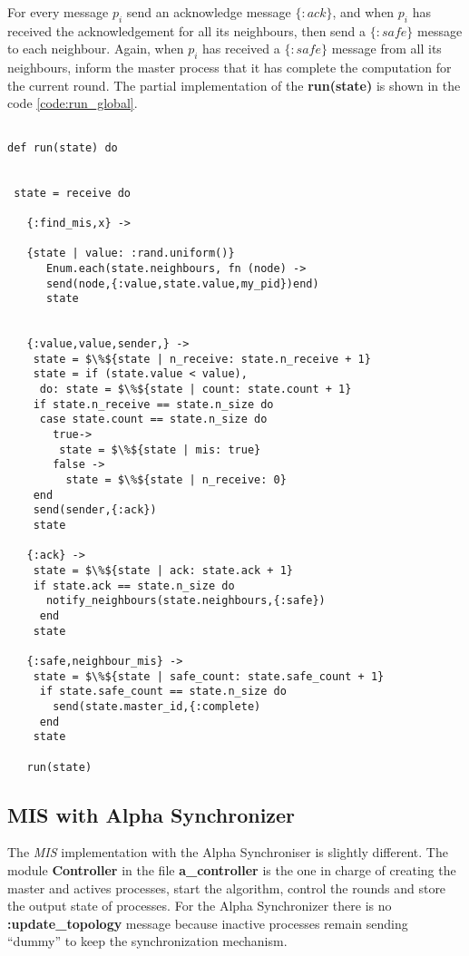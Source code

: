 For every message $p_i$ send an acknowledge message $\{:ack\}$, and when $p_i$ has received the acknowledgement for all its neighbours, then send a $\{:safe\}$ message to each neighbour. Again, when $p_i$ has received a  $\{:safe\}$ message from all its neighbours, inform the master process that it has complete the computation for the current round. The partial implementation of the \textbf{run(state)} is shown in the code \ref{code:run_global}.

\begin{lstlisting}[frame=single, columns=fullflexible, mathescape=true, caption= run function for \textit{MIS} , label = code:run_global]

def run(state) do


 state = receive do

   {:find_mis,x} ->  

   {state | value: :rand.uniform()}
      Enum.each(state.neighbours, fn (node) ->
      send(node,{:value,state.value,my_pid})end)
      state


   {:value,value,sender,} ->
    state = $\%${state | n_receive: state.n_receive + 1}
    state = if (state.value < value),
     do: state = $\%${state | count: state.count + 1} 
    if state.n_receive == state.n_size do
     case state.count == state.n_size do
       true->  
        state = $\%${state | mis: true}
       false ->
         state = $\%${state | n_receive: 0}
    end
    send(sender,{:ack})
    state

   {:ack} ->
    state = $\%${state | ack: state.ack + 1}
    if state.ack == state.n_size do
      notify_neighbours(state.neighbours,{:safe})
     end
    state

   {:safe,neighbour_mis} ->
    state = $\%${state | safe_count: state.safe_count + 1}
     if state.safe_count == state.n_size do
       send(state.master_id,{:complete)
     end
    state
    
   run(state)

\end{lstlisting}

\subsection{MIS with Alpha Synchronizer}

The \textit{MIS} implementation with the Alpha Synchroniser is slightly different. The module \textbf{Controller} in the file \textbf{a\_controller} is the one in charge of creating the master and actives processes, start the algorithm, control the rounds and store the output state of processes. For the Alpha Synchronizer there is no \textbf{:update\_topology} message because inactive processes remain sending ``dummy'' to keep the synchronization mechanism.


